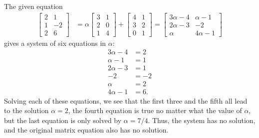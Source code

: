 The given equation
\begin{align*}
\begin{bmatrix}
2 & 1 \\
1 & -2 \\
2 & 6
\end{bmatrix}
&=
\alpha\begin{bmatrix}
3 & 1 \\
2 & 0 \\
1 & 4
\end{bmatrix}
+
\begin{bmatrix}
4 & 1 \\
3 & 2 \\
0 & 1
\end{bmatrix}
=
\begin{bmatrix}
3\alpha - 4 & \alpha - 1 \\
2\alpha - 3 & -2 \\
\alpha & 4\alpha - 1
\end{bmatrix}
\end{align*}
%
gives a system of six equations in $\alpha$:
%
\begin{align*}
3\alpha - 4 &= 2\\
\alpha - 1 &= 1 \\
2\alpha - 3&= 1\\
-2 &= -2\\
\alpha  &= 2\\
4\alpha - 1 &= 6.
\end{align*}
%
Solving each of these equations, we see that the first three and the fifth all lead to the solution $\alpha = 2$, the fourth equation is true no matter what the value of $\alpha$, but the last equation is only solved by $\alpha = 7/4$.  Thus, the system has no solution, and the original matrix equation also has no solution.
